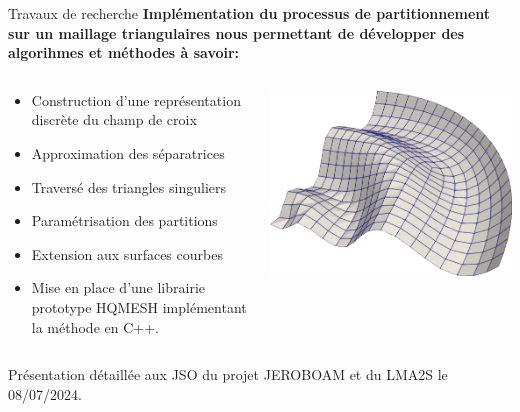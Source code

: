 \documentclass[compress,10pt,aspectratio=169]{beamer}
\begin{document}
\begin{frame}{Travaux de recherche}
\small
\vspace{-0.4cm}
{\bf Implémentation du processus de partitionnement sur un maillage triangulaires nous permettant de développer des algorihmes et méthodes à savoir:}%
\begin{columns}
    \begin{column}{0.6\textwidth}
\begin{itemize}
\item Construction d'une représentation discrète du champ de croix\\%
\item Approximation des séparatrices\\\vspace{0.1cm}
\item Traversé des triangles singuliers\\\vspace{0.1cm}
\item Paramétrisation des partitions\\\vspace{0.1cm}
\item Extension aux surfaces courbes\\\vspace{0.1cm}
\item Mise en place d'une librairie prototype HQMESH implémentant la méthode en C++.\\\vspace{0.3cm}
\end{itemize}
    \end{column}
    \begin{column}{0.4\textwidth}
        \centering
        \includegraphics[scale=0.28]{images/vagues.png}
    \end{column}
\end{columns}
Présentation détaillée aux JSO du projet JEROBOAM et du LMA2S le 08/07/2024.
\end{frame}
\end{document}
